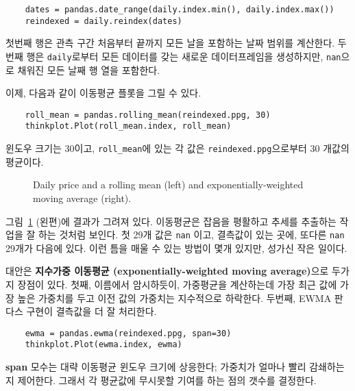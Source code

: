 \begin{verbatim}
    dates = pandas.date_range(daily.index.min(), daily.index.max())
    reindexed = daily.reindex(dates)
\end{verbatim}

첫번째 행은 관측 구간 처음부터 끝까지 모든 날을 포함하는 날짜 범위를 계산한다. 두번째 행은 {\tt daily}로부터 모든 데이터를 갖는 새로운 데이터프레임을 생성하지만, {\tt nan}으로 채워진 모든 날째 행 열을 포함한다.


이제, 다음과 같이 이동평균 플롯을 그릴 수 있다.

\begin{verbatim}
    roll_mean = pandas.rolling_mean(reindexed.ppg, 30)
    thinkplot.Plot(roll_mean.index, roll_mean)
\end{verbatim}

윈도우 크기는 30이고, \verb"roll_mean"에 있는 각 값은 {\tt reindexed.ppg}으로부터 30 개값의 평균이다.


\begin{figure}
\caption{Daily price and a rolling mean (left) and exponentially-weighted
moving average (right).}
\label{timeseries10}
\end{figure}

그림~\ref{timeseries10} (왼편)에 결과가 그려져 있다.
이동평균은 잡음을 평활하고 추세를 추출하는 작업을 잘 하는 것처럼 보인다. 
첫 29개 값은 {\tt nan} 이고, 결측값이 있는 곳에, 또다른 {\tt nan} 29개가 다음에 있다. 이런 틈을 매울 수 있는 방법이 몇개 있지만, 성가신 작은 일이다.

대안은 {\bf 지수가중 이동평균 (exponentially-weighted moving average)}으로 두가지 장점이 있다. 첫째, 이름에서 암시하듯이, 가중평균을 계산하는데 가장 최근 값에 가장 높은 가중치를 두고 이전 값의 가중치는 지수적으로 하락한다. 두번째, EWMA 판다스 구현이 결측값을 더 잘 처리한다.

\begin{verbatim}
    ewma = pandas.ewma(reindexed.ppg, span=30)
    thinkplot.Plot(ewma.index, ewma)
\end{verbatim}

{\bf span} 모수는 대략 이동평균 윈도우 크기에 상응한다; 가중치가 얼마나 빨리 감쇄하는지 제어한다. 그래서 각 평균값에 무시못할 기여를 하는 점의 갯수를 결정한다.

